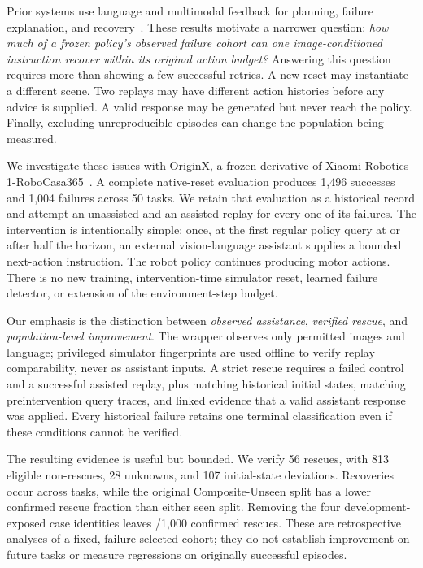 \documentclass[10pt,twocolumn,letterpaper]{article}
\begin{document}
Prior systems use language and multimodal feedback for planning, failure explanation, and recovery~\cite{saycan,innermonologue,reflect,racer,flare}. These results motivate a narrower question: \emph{how much of a frozen policy's observed failure cohort can one image-conditioned instruction recover within its original action budget?} Answering this question requires more than showing a few successful retries. A new reset may instantiate a different scene. Two replays may have different action histories before any advice is supplied. A valid response may be generated but never reach the policy. Finally, excluding unreproducible episodes can change the population being measured.

We investigate these issues with OriginX, a frozen derivative of Xiaomi-Robotics-1-RoboCasa365~\cite{xiaomi}. A complete native-reset evaluation produces 1,496 successes and 1,004 failures across 50 tasks. We retain that evaluation as a historical record and attempt an unassisted and an assisted replay for every one of its failures. The intervention is intentionally simple: once, at the first regular policy query at or after half the horizon, an external vision-language assistant supplies a bounded next-action instruction. The robot policy continues producing motor actions. There is no new training, intervention-time simulator reset, learned failure detector, or extension of the environment-step budget.

Our emphasis is the distinction between \emph{observed assistance}, \emph{verified rescue}, and \emph{population-level improvement}. The wrapper observes only permitted images and language; privileged simulator fingerprints are used offline to verify replay comparability, never as assistant inputs. A strict rescue requires a failed control and a successful assisted replay, plus matching historical initial states, matching preintervention query traces, and linked evidence that a valid assistant response was applied. Every historical failure retains one terminal classification even if these conditions cannot be verified.

The resulting evidence is useful but bounded. We verify 56 rescues, with 813 eligible non-rescues, 28 unknowns, and 107 initial-state deviations. Recoveries occur across \RescuedTasks{} tasks, while the original Composite-Unseen split has a lower confirmed rescue fraction than either seen split. Removing the four development-exposed case identities leaves \NoPilotRescues{}/1,000 confirmed rescues. These are retrospective analyses of a fixed, failure-selected cohort; they do not establish improvement on future tasks or measure regressions on originally successful episodes.
\end{document}
